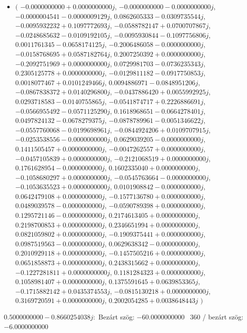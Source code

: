 \documentclass[14pt,a4paper]{article}
\begin{document}
\begin{itemize}
\item
$\big($
$-0.0000000000+0.0000000000j$, $-0.0000000000-0.0000000000j$, $-0.0000004541-0.0000009129j$, $0.0862605333-0.0309735544j$, $-0.0095932232+0.1097772693j$, $-0.0588782147+0.0700707867j$, $-0.0248685632-0.0109192105j$, $-0.0095930844-0.1097756806j$, $0.0011761345-0.0658174125j$, $-0.2006486058-0.0000000000j$, $-0.0158768695+0.0587182764j$, $0.2007250392+0.0000000000j$, $-0.2092751969+0.0000000000j$, $0.0729981703-0.0736235343j$, $0.2305125778+0.0000000000j$, $-0.0129811182-0.0917750853j$, $0.0018077467+0.0101249466j$, $0.0094886971-0.0848951206j$, $-0.0867838372+0.0140296800j$, $-0.0437886420+0.0055992925j$, $0.0293718583-0.0140755865j$, $-0.0541874717+0.2226886691j$, $-0.0566955492-0.0571125290j$, $0.1618968651-0.0664278401j$, $0.0497824132-0.0678279375j$, $-0.0878789961-0.0051346622j$, $-0.0557760068-0.0199698961j$, $-0.0844924206+0.0109707915j$, $-0.0253538556-0.0000000000j$, $0.0629039205-0.0000000000j$, $0.1411505457+0.0000000000j$, $-0.0047262557+0.0000000000j$, $-0.0457105839+0.0000000000j$, $-0.2121068519+0.0000000000j$, $0.1761628954-0.0000000000j$, $0.1602335040+0.0000000000j$, $-0.1058680297+0.0000000000j$, $-0.0545763664-0.0000000000j$, $-0.1053635523+0.0000000000j$, $0.0101908842-0.0000000000j$, $0.0642479108+0.0000000000j$, $-0.1577136780+0.0000000000j$, $0.0489039578-0.0000000000j$, $-0.0590789398+0.0000000000j$, $0.1295721146-0.0000000000j$, $0.2174613405+0.0000000000j$, $0.2198700853+0.0000000000j$, $0.2346651994+0.0000000000j$, $0.0821059802+0.0000000000j$, $-0.1909375441+0.0000000000j$, $0.0987519563-0.0000000000j$, $0.0629638342-0.0000000000j$, $0.2010929118+0.0000000000j$, $-0.1457505216+0.0000000000j$, $0.0651858873+0.0000000000j$, $0.2438315662+0.0000000000j$, $-0.1227281811+0.0000000000j$, $0.1181284323+0.0000000000j$, $0.1058981407+0.0000000000j$, $0.1375591645+0.0639853365j$, $-0.1715882142+0.0435374553j$, $-0.0815130218+0.0000000000j$, $0.3169720591+0.0000000000j$, $0.2002054285+0.0038648443j$
$\big)$
\end{itemize}
$0.5000000000-0.8660254038j$:\
Bezárt szög: $-60.0000000000$ \
360 / bezárt szög: $-6.0000000000$\
\end{document}

